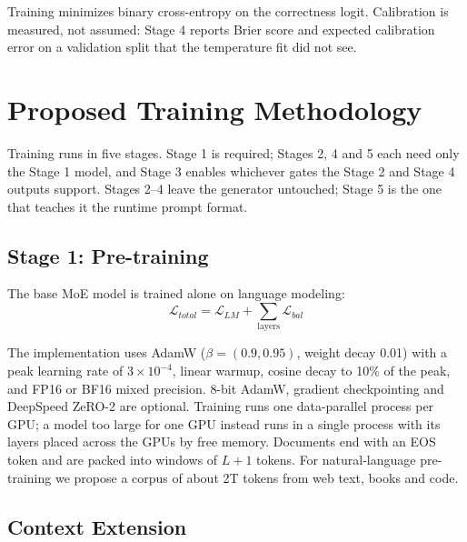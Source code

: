 \documentclass{article}
\begin{document}
Training minimizes binary cross-entropy on the correctness logit. Calibration is measured, not assumed: Stage 4 reports Brier score and expected calibration error on a validation split that the temperature fit did not see.

\section{Proposed Training Methodology}

Training runs in five stages. Stage 1 is required; Stages 2, 4 and 5 each need only the Stage 1 model, and Stage 3 enables whichever gates the Stage 2 and Stage 4 outputs support. Stages 2--4 leave the generator untouched; Stage 5 is the one that teaches it the runtime prompt format.

\subsection{Stage 1: Pre-training}

The base MoE model is trained alone on language modeling:
\begin{equation}
\mathcal{L}_{total} = \mathcal{L}_{LM} + \sum_{\text{layers}} \mathcal{L}_{bal}
\end{equation}

The implementation uses AdamW \cite{loshchilov2019adamw} ($\beta = (0.9, 0.95)$, weight decay 0.01) with a peak learning rate of $3 \times 10^{-4}$, linear warmup, cosine decay to 10\% of the peak, and FP16 or BF16 mixed precision. 8-bit AdamW, gradient checkpointing and DeepSpeed ZeRO-2 are optional. Training runs one data-parallel process per GPU; a model too large for one GPU instead runs in a single process with its layers placed across the GPUs by free memory. Documents end with an EOS token and are packed into windows of $L+1$ tokens. For natural-language pre-training we propose a corpus of about 2T tokens from web text, books and code.

\subsection{Context Extension}
\label{sec:long-context}
\end{document}
